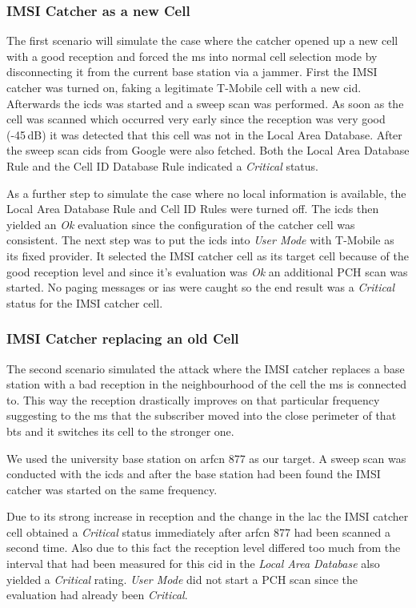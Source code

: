 \subsubsection{IMSI Catcher as a new Cell}
The first scenario will simulate the case where the catcher opened up a new cell with a good reception and forced the \gls{ms} into normal cell selection mode by disconnecting it from the current base station via a jammer.
First the IMSI catcher was turned on, faking a legitimate T-Mobile cell with a new \gls{cid}.
Afterwards the \gls{icds} was started and a sweep scan was performed.
As soon as the cell was scanned which occurred very early since the reception was very good (-45\,dB) it was detected that this cell was not in the Local Area Database.
After the sweep scan \glspl{cid} from Google were also fetched.
Both the Local Area Database Rule and the Cell ID Database Rule indicated a \emph{Critical} status.

As a further step to simulate the case where no local information is available, the Local Area Database Rule and Cell ID Rules were turned off.
The \gls{icds} then yielded an \emph{Ok} evaluation since the configuration of the catcher cell was consistent.
The next step was to put the \gls{icds} into \emph{User Mode} with T-Mobile as its fixed provider. 
It selected the IMSI catcher cell as its target cell because of the good reception level and since it's evaluation was \emph{Ok} an additional PCH scan was started.
No paging messages or \glspl{ia} were caught so the end result was a \emph{Critical} status for the IMSI catcher cell.


\subsubsection{IMSI Catcher replacing an old Cell}
The second scenario simulated the attack where the IMSI catcher replaces a base station with a bad reception in the neighbourhood of the cell the \gls{ms} is connected to.
This way the reception drastically improves on that particular frequency suggesting to the \gls{ms} that the subscriber moved into the close perimeter of that \gls{bts} and it switches its cell to the stronger one.

We used the university base station on \gls{arfcn} 877 as our target.
A sweep scan was conducted with the \gls{icds} and after the base station had been found the IMSI catcher was started on the same frequency.

Due to its strong increase in reception and the change in the \gls{lac} the IMSI catcher cell obtained a \emph{Critical} status immediately after \gls{arfcn} 877 had been scanned a second time.
Also due to this fact the reception level differed too much from the interval that had been measured for this \gls{cid}  in the \emph{Local Area Database} also yielded a \emph{Critical} rating.
\emph{User Mode} did not start a PCH scan since the evaluation had already been \emph{Critical}.